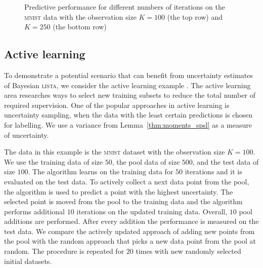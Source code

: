 \documentclass{article}
\begin{document}
\begin{figure}[t!]
  \caption{Predictive performance for different numbers of iterations on the \textsc{mnist} data with the observation size $K = 100$ (the top row) and $K = 250$ (the bottom row)}
  \label{fig:mnist}
  \end{figure}
  
  \subsection{Active learning}
  To demonstrate a potential scenario that can benefit from uncertainty estimates of Bayesian \textsc{lista}, we consider the active learning example \cite{settles.tr09}. The active learning area researches ways to select new training subsets to reduce the total number of required supervision. One of the popular approaches in active learning is uncertainty sampling, when the data with the least certain predictions is chosen for labelling. We use a variance from Lemma~\ref{thm:moments_spsl} as a measure of uncertainty.
  
  The data in this example is the \textsc{mnist} dataset with the observation size $K=100$. We use the training data of size $50$, the pool data of size $500$,  and the test data of size $100$. The algorithm learns on the training data for $50$ iterations and it is evaluated on the test data. To actively collect a next data point from the pool, the algorithm is used to predict a point with the highest uncertainty. The selected point is moved from the pool to the training data and the algorithm performs additional $10$ iterations on the updated training data. Overall, $10$ pool additions are performed. After every addition the performance is measured on the test data. We compare the actively updated approach of adding new points from the pool with the random approach that picks a new data point from the pool at random. The procedure is repeated for $20$ times with new randomly selected initial datasets.
  
\end{document}
